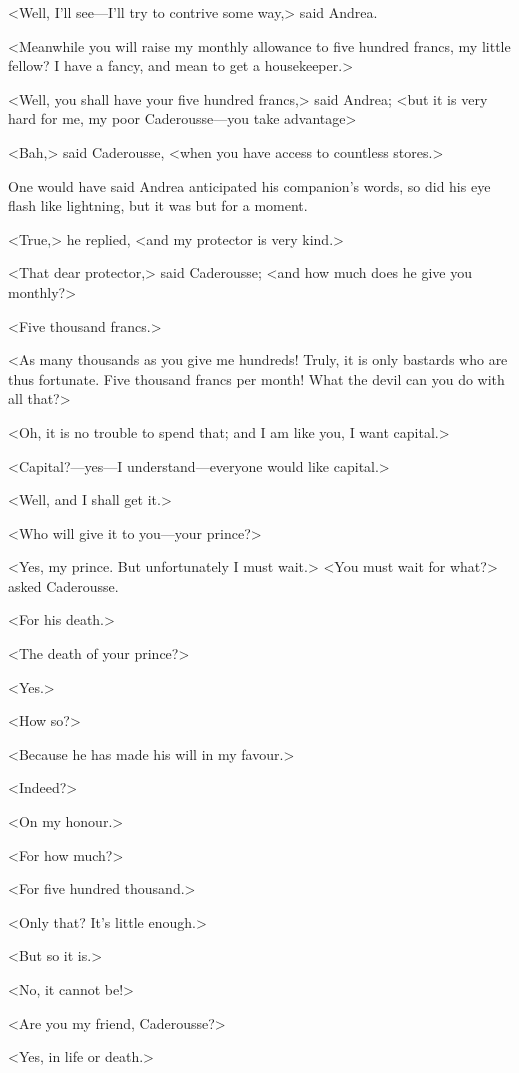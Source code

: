  <Well, I'll see—I'll try to contrive some way,> said Andrea. 

 <Meanwhile you will raise my monthly allowance to five hundred francs, my little fellow? I have a fancy, and mean to get a housekeeper.> 

 <Well, you shall have your five hundred francs,> said Andrea; <but it is very hard for me, my poor Caderousse—you take advantage\longdash> 

 <Bah,> said Caderousse, <when you have access to countless stores.> 

 One would have said Andrea anticipated his companion's words, so did his eye flash like lightning, but it was but for a moment. 

 <True,> he replied, <and my protector is very kind.> 

 <That dear protector,> said Caderousse; <and how much does he give you monthly?> 

 <Five thousand francs.> 

 <As many thousands as you give me hundreds! Truly, it is only bastards who are thus fortunate. Five thousand francs per month! What the devil can you do with all that?> 

 <Oh, it is no trouble to spend that; and I am like you, I want capital.> 

 <Capital?—yes—I understand—everyone would like capital.> 

 <Well, and I shall get it.> 

 <Who will give it to you—your prince?> 

 <Yes, my prince. But unfortunately I must wait.>  <You must wait for what?> asked Caderousse. 

 <For his death.> 

 <The death of your prince?> 

 <Yes.> 

 <How so?> 

 <Because he has made his will in my favour.> 

 <Indeed?> 

 <On my honour.> 

 <For how much?> 

 <For five hundred thousand.> 

 <Only that? It's little enough.> 

 <But so it is.> 

 <No, it cannot be!> 

 <Are you my friend, Caderousse?> 

 <Yes, in life or death.> 


